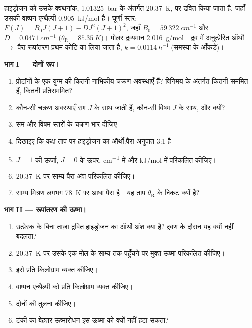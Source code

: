 \begin{problem}
\label{pb:b3:statistical-thermo-applied:1}
हाइड्रोजन को उसके क्वथनांक, \qty{1.01325}{bar} के अंतर्गत \qty{20.37}{K}, पर द्रवित किया जाता है, जहाँ उसकी
वाष्पन एन्थैल्पी \qty{0.905}{kJ/mol} है। घूर्णी स्तर: $F(J) = B_0J(J+1) -
D J^2(J+1)^2$, जहाँ $B_0 = \qty{59.322}{cm^{-1}}$ और $D = \qty{0.0471}{cm^{-1}}$ ($\theta_{\mathrm R} = \qty{85.35}{K}$)।
मोलर द्रव्यमान \qty{2.016}{g/mol}। द्रव में अनुत्प्रेरित ऑर्थो $\to$ पैरा रूपांतरण
प्रथम कोटि का लिया जाता है, $k = \qty{0.0114}{h^{-1}}$ (समस्या के आँकड़े)।

\medskip\noindent\textbf{भाग I --- दोनों रूप।}
\begin{enumerate}
  \item प्रोटॉनों के एक युग्म की कितनी नाभिकीय-चक्रण अवस्थाएँ हैं? विनिमय के अंतर्गत कितनी
        सममित हैं, कितनी प्रतिसममित?
  \item कौन-सी चक्रण अवस्थाएँ सम $J$ के साथ जाती हैं, कौन-सी विषम $J$ के साथ, और क्यों?
  \item सम और विषम स्तरों के चक्रण भार दीजिए।
  \item दिखाइए कि कक्ष ताप पर हाइड्रोजन का ऑर्थो:पैरा अनुपात 3:1 है।
  \item $J = 1$ की ऊर्जा, $J = 0$ के ऊपर, \unit{cm^{-1}} में और
        \unit{kJ/mol} में परिकलित कीजिए।
  \item \qty{20.37}{K} पर साम्य पैरा अंश परिकलित कीजिए।
  \item साम्य मिश्रण लगभग \qty{78}{K} पर आधा पैरा है। यह
        ताप $\theta_{\mathrm R}$ के निकट क्यों है?
\end{enumerate}

\medskip\noindent\textbf{भाग II --- रूपांतरण की ऊष्मा।}
\begin{enumerate}[resume]
  \item उत्प्रेरक के बिना ताज़ा द्रवित हाइड्रोजन का ऑर्थो अंश क्या है? द्रवण के
        दौरान यह क्यों नहीं बदलता?
  \item \qty{20.37}{K} पर उसके एक मोल के साम्य तक पहुँचने पर मुक्त ऊष्मा
        परिकलित कीजिए।
  \item इसे प्रति किलोग्राम व्यक्त कीजिए।
  \item वाष्पन एन्थैल्पी को प्रति किलोग्राम व्यक्त कीजिए।
  \item दोनों की तुलना कीजिए।
  \item टंकी का बेहतर ऊष्मारोधन इस ऊष्मा को क्यों नहीं हटा सकता?
\end{enumerate}


\end{problem}

